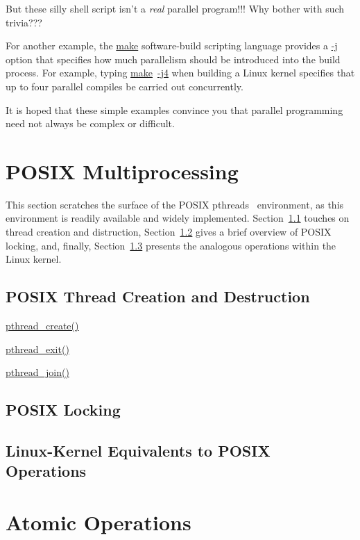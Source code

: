 \QuickQuiz{}
	But these silly shell script isn't a \emph{real} parallel
	program!!!
	Why bother with such trivia???
 \QuickQuizEnd

For another example, the \url{make} software-build scripting language
provides a \url{-j} option that specifies how much parallelism should be
introduced into the build process.
For example, typing \url{make}~\url{-j4} when building a Linux kernel
specifies that up to four parallel compiles be carried out concurrently.

It is hoped that these simple examples convince you that parallel
programming need not always be complex or difficult.

\section{POSIX Multiprocessing}
\label{sec:toolsoftrade:POSIX Multiprocessing}

This section scratches the surface of the
POSIX pthreads~\cite{OpenGroup1997pthreads}
environment, as this environment is readily available and widely
implemented.
Section~\ref{sec:toolsoftrade:POSIX Thread Creation and Destruction}
touches on thread creation and distruction,
Section~\ref{sec:toolsoftrade:POSIX Locking} gives a brief overview
of POSIX locking, and, finally,
Section~\ref{sec:toolsoftrade:Linux-Kernel Equivalents to POSIX Operations}
presents the analogous operations within the Linux kernel.

\subsection{POSIX Thread Creation and Destruction}
\label{sec:toolsoftrade:POSIX Thread Creation and Destruction}

\url{pthread_create()}

\url{pthread_exit()}

\url{pthread_join()}

\subsection{POSIX Locking}
\label{sec:toolsoftrade:POSIX Locking}

\subsection{Linux-Kernel Equivalents to POSIX Operations}
\label{sec:toolsoftrade:Linux-Kernel Equivalents to POSIX Operations}

\section{Atomic Operations}
\label{sec:toolsoftrade:Atomic Operations}
